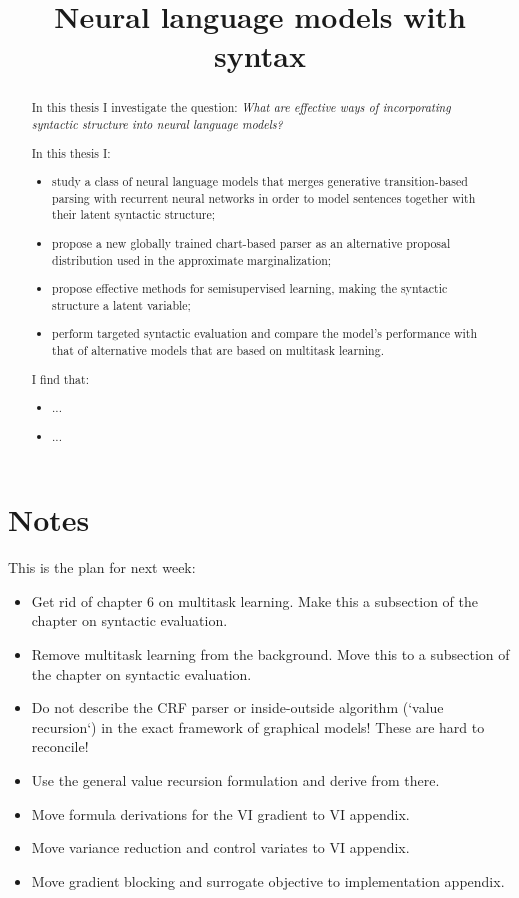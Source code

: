 \documentclass[examplefnt,biber]{../src/nowfnt} %
\title{Neural language models with syntax}
\begin{document}
\makeabstracttitle

\begin{abstract}
In this thesis I investigate the question: \textit{What are effective ways of incorporating syntactic structure into neural language models?}

In this thesis I:
\begin{itemize}
  \item study a class of neural language models that merges generative transition-based parsing with recurrent neural networks in order to model sentences together with their latent syntactic structure;
  \item propose a new globally trained chart-based parser as an alternative proposal distribution used in the approximate marginalization;
  \item propose effective methods for semisupervised learning, making the syntactic structure a latent variable;
  \item perform targeted syntactic evaluation and compare the model's performance with that of alternative models that are based on multitask learning.
\end{itemize}
I find that:
\begin{itemize}
  \item ...
  \item ...
\end{itemize}
\end{abstract}

\chapter{Notes}
This is the plan for next week:
\begin{itemize}
  \item Get rid of chapter 6 on multitask learning. Make this a subsection of the chapter on syntactic evaluation.
  \item Remove multitask learning from the background. Move this to a subsection of the chapter on syntactic evaluation.
  \item Do not describe the CRF parser or inside-outside algorithm (`value recursion`) in the exact framework of graphical models! These are hard to reconcile!
  \item Use the general value recursion formulation and derive from there.
  \item Move formula derivations for the VI gradient to VI appendix.
  \item Move variance reduction and control variates to VI appendix.
  \item Move gradient blocking and surrogate objective to implementation appendix.
\end{itemize}
\end{document}
